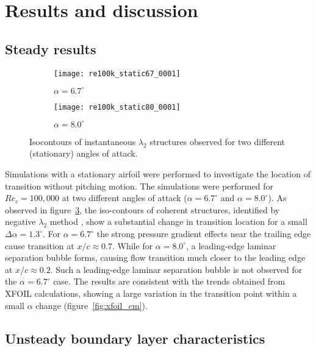 \section{Results and discussion}
\subsection{Steady results}
\begin{figure}[t]
	\begin{subfigure}[b]{0.49\textwidth}
		\centering
		\texttt{[image: re100k\_static67\_0001]}
		\caption{$\alpha=6.7^{\circ}$}
		\label{fig:aoa67_iso}
	\end{subfigure}
	\begin{subfigure}[b]{0.49\textwidth}
		\centering
		\texttt{[image: re100k\_static80\_0001]}
		\caption{$\alpha=8.0^{\circ}$}
		\label{fig:aoa80_iso}
	\end{subfigure}
	\caption{Isocontours of instantaneous $\lambda_{2}$ structures observed for two different (stationary) angles of attack.}
	\label{fig:isocontour_aoa}
\end{figure}

Simulations with a stationary airfoil were performed to investigate the location of transition without pitching motion. The simulations were performed for $Re_{c}=100,000$ at two different angles of attack ($\alpha=6.7^{\circ}$ and $\alpha=8.0^{\circ}$). As observed in figure~\ref{fig:isocontour_aoa}, the iso-contours of coherent structures, identified by negative $\lambda_{2}$ method \citep{jeong95}, show a substantial change in transition location for a small $\Delta\alpha=1.3^{\circ}$. For $\alpha=6.7^{\circ}$ the strong pressure gradient effects near the trailing edge cause transition at $x/c\approx0.7$. While for $\alpha=8.0^{\circ}$, a leading-edge laminar separation bubble forms, causing flow transition much closer to the leading edge at $x/c\approx0.2$. Such a leading-edge laminar separation bubble is not observed for the $\alpha=6.7^{\circ}$ case. The results are consistent with the trends obtained from XFOIL calculations, showing a large variation in the transition point within a small $\alpha$ change (figure~\ref{fig:xfoil_cm}).
\subsection{Unsteady boundary layer characteristics}

